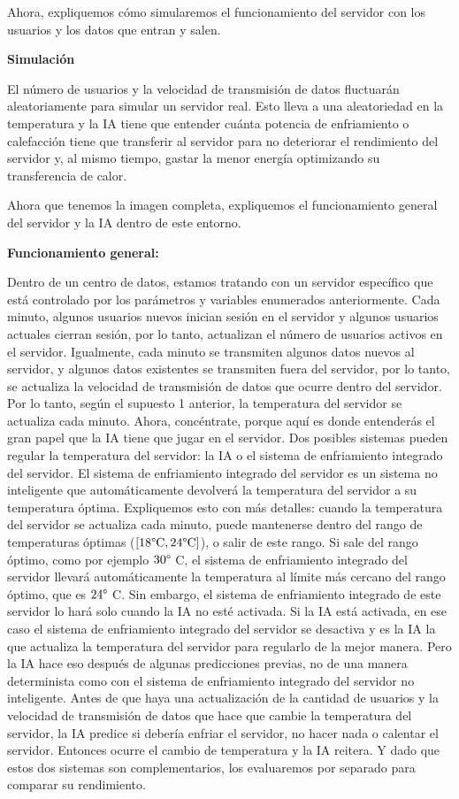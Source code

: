 \documentclass[]{book}
\begin{document}
Ahora, expliquemos cómo simularemos el funcionamiento del servidor con los usuarios y los datos que entran y salen.

\textbf{Simulación}

El número de usuarios y la velocidad de transmisión de datos fluctuarán aleatoriamente para simular un servidor real. Esto lleva a una aleatoriedad en la temperatura y la IA tiene que entender cuánta potencia de enfriamiento o calefacción tiene que transferir al servidor para no deteriorar el rendimiento del servidor y, al mismo tiempo, gastar la menor energía optimizando su transferencia de calor.

Ahora que tenemos la imagen completa, expliquemos el funcionamiento general del servidor y la IA dentro de este entorno.

\textbf{Funcionamiento general:}

Dentro de un centro de datos, estamos tratando con un servidor específico que está controlado por los parámetros y variables enumerados anteriormente. Cada minuto, algunos usuarios nuevos inician sesión en el servidor y algunos usuarios actuales cierran sesión, por lo tanto, actualizan el número de usuarios activos en el servidor. Igualmente, cada minuto se transmiten algunos datos nuevos al servidor, y algunos datos existentes se transmiten fuera del servidor, por lo tanto, se actualiza la velocidad de transmisión de datos que ocurre dentro del servidor. Por lo tanto, según el supuesto 1 anterior, la temperatura del servidor se actualiza cada minuto. Ahora, concéntrate, porque aquí es donde entenderás el gran papel que la IA tiene que jugar en el servidor. Dos posibles sistemas pueden regular la temperatura del servidor: la IA o el sistema de enfriamiento integrado del servidor. El sistema de enfriamiento integrado del servidor es un sistema no inteligente que automáticamente devolverá la temperatura del servidor a su temperatura óptima. Expliquemos esto con más detalles: cuando la temperatura del servidor se actualiza cada minuto, puede mantenerse dentro del rango de temperaturas óptimas (\([18 \degree \textrm{C}, 24 \degree \textrm{C}]\)), o salir de este rango. Si sale del rango óptimo, como por ejemplo \(30 \degree\) C, el sistema de enfriamiento integrado del servidor llevará automáticamente la temperatura al límite más cercano del rango óptimo, que es \(24 \degree\) C. Sin embargo, el sistema de enfriamiento integrado de este servidor lo hará solo cuando la IA no esté activada. Si la IA está activada, en ese caso el sistema de enfriamiento integrado del servidor se desactiva y es la IA la que actualiza la temperatura del servidor para regularlo de la mejor manera. Pero la IA hace eso después de algunas predicciones previas, no de una manera determinista como con el sistema de enfriamiento integrado del servidor no inteligente. Antes de que haya una actualización de la cantidad de usuarios y la velocidad de transmisión de datos que hace que cambie la temperatura del servidor, la IA predice si debería enfriar el servidor, no hacer nada o calentar el servidor. Entonces ocurre el cambio de temperatura y la IA reitera. Y dado que estos dos sistemas son complementarios, los evaluaremos por separado para comparar su rendimiento.
\end{document}
